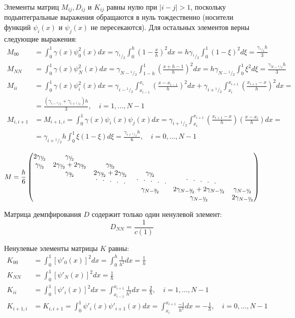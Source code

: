 \documentclass[12pt]{article}
\newcommand{\cutefrac}[2]{{}^{#1\!}\!/{\!}_#2}
\newcommand{\half}{\cutefrac{1}{2}}
\newcommand{\cuteddots}{
\text{
\raisebox{.6ex}{$\cdot$}\hspace{.75em}%
\raisebox{.3ex}{$\cdot$}\hspace{.75em}%
$\cdot$\hspace{.75em}%
\raisebox{-.3ex}{$\cdot$}\hspace{.75em}%
\raisebox{-.6ex}{$\cdot$}%
}}
\begin{document}
Элементы матриц $M_{ij}, D_{ij}$ и $K_{ij}$ равны нулю при $|i - j| > 1$, 
поскольку подынтегральные выражения обращаются в нуль тождественно
(носители функций $\psi_i(x)$ и $\psi_j(x)$ не пересекаются). Для
остальных элементов верны следующие выражения:
\begin{align*}
M_{00} &= \int_0^1 \gamma(x) \psi_0^2(x) dx = \gamma_{\half}\int_0^h
\left(1-\frac{x}{h}\right)^2 dx = h \gamma_{\half} \int_0^1 (1-\xi)^2 d\xi =
\frac{\gamma_{\half}h}{3}\\
M_{NN} &= \int_0^1 \gamma(x) \psi_N^2(x) dx = \gamma_{N - \half}\int_{1-h}^1
\left(\frac{x + h - 1}{h}\right)^2 dx = h \gamma_{N - \half} \int_0^1 \xi^2 d\xi =
\frac{\gamma_{N - \half}h}{3}\\
M_{ii} &= \int_0^1 \gamma(x) \psi_i^2(x) dx = 
\gamma_{i - \half}\int_{x_{i-1}}^{x_i} \left(\frac{x - x_{i-1}}{h}\right)^2 dx +
\gamma_{i + \half}\int_{x_i}^{x_{i+1}} \left(\frac{x_{i+1} - x}{h}\right)^2 dx =\\ 
&= \frac{(\gamma_{i-\half} + \gamma_{i+\half})h}{3}, \quad i=1, \dots,N-1\\
M_{i,i+1} &= M_{i+1,i} = \int_0^1 \gamma(x) \psi_i(x) \psi_j(x) dx = 
\gamma_{i + \half}\int_{x_i}^{x_{i+1}} 
\left(\frac{x_{i+1} - x}{h}\right)\left(\frac{x - x_i}{h}\right) dx =\\
&= 
\gamma_{i+\half} h \int_0^1 \xi(1-\xi) d\xi = \frac{\gamma_{i+\half}h}{6},
\quad i=0, \dots,N-1
\end{align*}

\[
M = \frac{h}{6}
\begin{pmatrix}
2\gamma_{\half} & \gamma_{\half} & \\
\gamma_{\half} & 2\gamma_{\half} + 2\gamma_{\cutefrac{3}{2}} & \gamma_{\cutefrac{3}{2}}\\
& \gamma_{\cutefrac{3}{2}} & 2\gamma_{\cutefrac{3}{2}} + 2\gamma_{\cutefrac{5}{2}} & \gamma_{\cutefrac{5}{2}}\\
& & \cuteddots\; & \cuteddots & \;\cuteddots \\
& & & \gamma_{N - \cutefrac{3}{2}} & 2\gamma_{N - \cutefrac{3}{2}} + 2\gamma_{N
- \half} & \gamma_{N-\half}\\
& & & & \gamma_{N - \half} & 2\gamma_{N-\half}
\end{pmatrix}
\]

Матрица демпфирования $D$ содержит только один ненулевой элемент:
\[
D_{NN} = \frac{1}{c(1)}
\]

Ненулевые элементы матрицы $K$ равны:
\begin{align*}
K_{00} &= \int_0^1 \left[\psi'_0(x)\right]^2 dx = \int_0^h \frac{1}{h^2} dx =
\frac{1}{h}\\
K_{NN} &= \int_0^1 \left[\psi'_N(x)\right]^2 dx = \frac{1}{h}\\
K_{ii} &= \int_0^1 \left[\psi'_i(x)\right]^2 dx = 
\int_{x_{i-1}}^{x_{i+1}} \frac{1}{h^2} dx = \frac{2}{h}, \quad i=1, \dots,N-1\\
K_{i+1,i} &= K_{i,i+1} = \int_0^1 \psi'_{i}(x) \psi'_{i+1}(x) dx =
\int_{x_i}^{x_{i+1}} \frac{-1}{h^2} dx = -\frac{1}{h}, \quad i=0, \dots,N-1
\end{align*}
\end{document}
